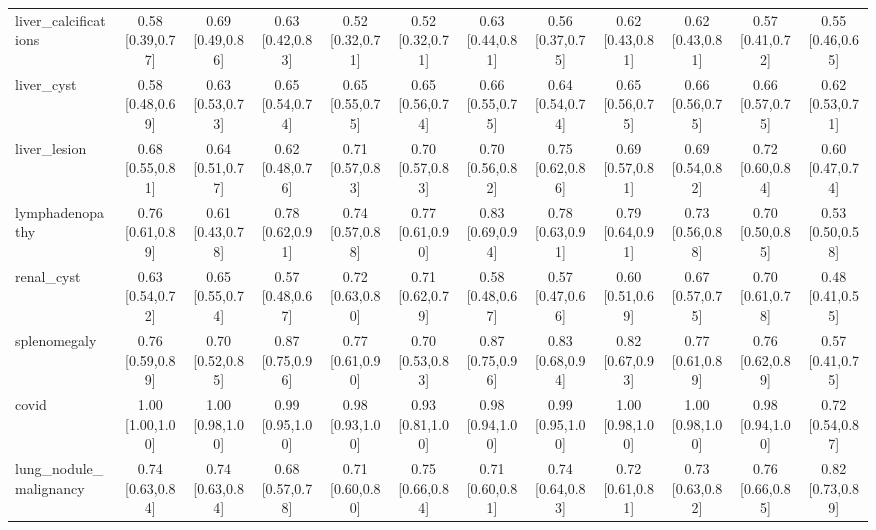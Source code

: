 \begin{tabular}{lccccccccccc}
liver\_calcifications & 0.58 [0.39,0.77] & 0.69 [0.49,0.86] & 0.63 [0.42,0.83] & 0.52 [0.32,0.71] & 0.52 [0.32,0.71] & 0.63 [0.44,0.81] & 0.56 [0.37,0.75] & 0.62 [0.43,0.81] & 0.62 [0.43,0.81] & 0.57 [0.41,0.72] & 0.55 [0.46,0.65] \\
liver\_cyst & 0.58 [0.48,0.69] & 0.63 [0.53,0.73] & 0.65 [0.54,0.74] & 0.65 [0.55,0.75] & 0.65 [0.56,0.74] & 0.66 [0.55,0.75] & 0.64 [0.54,0.74] & 0.65 [0.56,0.75] & 0.66 [0.56,0.75] & 0.66 [0.57,0.75] & 0.62 [0.53,0.71] \\
liver\_lesion & 0.68 [0.55,0.81] & 0.64 [0.51,0.77] & 0.62 [0.48,0.76] & 0.71 [0.57,0.83] & 0.70 [0.57,0.83] & 0.70 [0.56,0.82] & 0.75 [0.62,0.86] & 0.69 [0.57,0.81] & 0.69 [0.54,0.82] & 0.72 [0.60,0.84] & 0.60 [0.47,0.74] \\
lymphadenopathy & 0.76 [0.61,0.89] & 0.61 [0.43,0.78] & 0.78 [0.62,0.91] & 0.74 [0.57,0.88] & 0.77 [0.61,0.90] & 0.83 [0.69,0.94] & 0.78 [0.63,0.91] & 0.79 [0.64,0.91] & 0.73 [0.56,0.88] & 0.70 [0.50,0.85] & 0.53 [0.50,0.58] \\
renal\_cyst & 0.63 [0.54,0.72] & 0.65 [0.55,0.74] & 0.57 [0.48,0.67] & 0.72 [0.63,0.80] & 0.71 [0.62,0.79] & 0.58 [0.48,0.67] & 0.57 [0.47,0.66] & 0.60 [0.51,0.69] & 0.67 [0.57,0.75] & 0.70 [0.61,0.78] & 0.48 [0.41,0.55] \\
splenomegaly & 0.76 [0.59,0.89] & 0.70 [0.52,0.85] & 0.87 [0.75,0.96] & 0.77 [0.61,0.90] & 0.70 [0.53,0.83] & 0.87 [0.75,0.96] & 0.83 [0.68,0.94] & 0.82 [0.67,0.93] & 0.77 [0.61,0.89] & 0.76 [0.62,0.89] & 0.57 [0.41,0.75] \\
covid & 1.00 [1.00,1.00] & 1.00 [0.98,1.00] & 0.99 [0.95,1.00] & 0.98 [0.93,1.00] & 0.93 [0.81,1.00] & 0.98 [0.94,1.00] & 0.99 [0.95,1.00] & 1.00 [0.98,1.00] & 1.00 [0.98,1.00] & 0.98 [0.94,1.00] & 0.72 [0.54,0.87] \\
lung\_nodule\_malignancy & 0.74 [0.63,0.84] & 0.74 [0.63,0.84] & 0.68 [0.57,0.78] & 0.71 [0.60,0.80] & 0.75 [0.66,0.84] & 0.71 [0.60,0.81] & 0.74 [0.64,0.83] & 0.72 [0.61,0.81] & 0.73 [0.63,0.82] & 0.76 [0.66,0.85] & 0.82 [0.73,0.89] \\
\bottomrule
\end{tabular}
